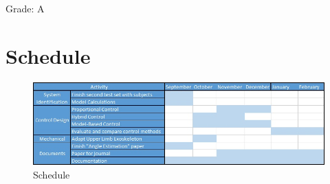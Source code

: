 Grade: A


\clearpage

\section{Schedule} 

\begin{figure}[thpb]
      \centering
      \includegraphics[width = \textwidth]{Images/Schedule.jpg}
      \caption{Schedule}
      \label{Schedule}
   \end{figure}